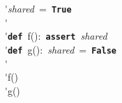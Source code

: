 \'\>\textit{shared}~=~\texttt{\textbf{True}}\\

\'\>\\

\'\>\texttt{\textbf{def}}~f():~\texttt{\textbf{assert}}~\textit{shared}\\

\'\>\texttt{\textbf{def}}~g():~\textit{shared}~=~\texttt{\textbf{False}}\\

\'\>\\

\'\>f()\\

\'\>g()